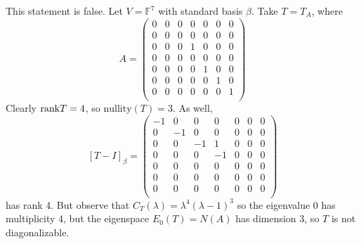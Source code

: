 \documentclass{eh-homework}
\begin{document}
\begin{question}{11}
    This statement is false. Let \(V = \mathbb{F}^7\) with standard basis \(\beta\). Take \(T = T_A\), where
    \[
        A = \begin{pmatrix}
            0 & 0 & 0 & 0 & 0 & 0 &  0 \\
            0 & 0 & 0 & 0 & 0 & 0 &  0 \\
            0 & 0 & 0 & 1 & 0 & 0 &  0 \\
            0 & 0 & 0 & 0 & 0 & 0 &  0 \\
            0 & 0 & 0 & 0 & 1 & 0 &  0 \\
            0 & 0 & 0 & 0 & 0 & 1 &  0 \\
            0 & 0 & 0 & 0 & 0 & 0 &  1 \\
        \end{pmatrix}
    \]
    Clearly \(\mathrm{rank} T = 4\), so \(\mathrm{nullity} (T) = 3\). As well,
    \[
        [T - I]_\beta = \begin{pmatrix}
            -1 & 0 & 0 & 0 & 0 & 0 &  0 \\
            0 & -1 & 0 & 0 & 0 & 0 &  0 \\
            0 & 0 & -1 & 1 & 0 & 0 &  0 \\
            0 & 0 & 0 & -1 & 0 & 0 &  0 \\
            0 & 0 & 0 & 0 & 0 & 0 &  0 \\
            0 & 0 & 0 & 0 & 0 & 0 &  0 \\
            0 & 0 & 0 & 0 & 0 & 0 &  0 \\
        \end{pmatrix}
    \]
    has rank 4. But observe that \(C_T(\lambda) = \lambda ^4 (\lambda - 1)^3\) so the eigenvalue \(0\) has multiplicity 4, but the eigenspace \(E_0(T) = N(A)\) has dimension \(3\), so \(T\) is not diagonalizable.
    \end{question}
\end{document}
